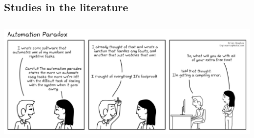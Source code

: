\documentclass[
  letterpaper,
  DIV=11,
  numbers=noendperiod,
  oneside]{scrartcl}
\begin{document}
\subsection{Studies in the literature}\label{studies-in-the-literature}

\subsection{}\label{section-53}

\begin{center}
\includegraphics{figs/Automation+Paradox.jpg}
\end{center}

\subsection{}\label{section-54}
\end{document}
